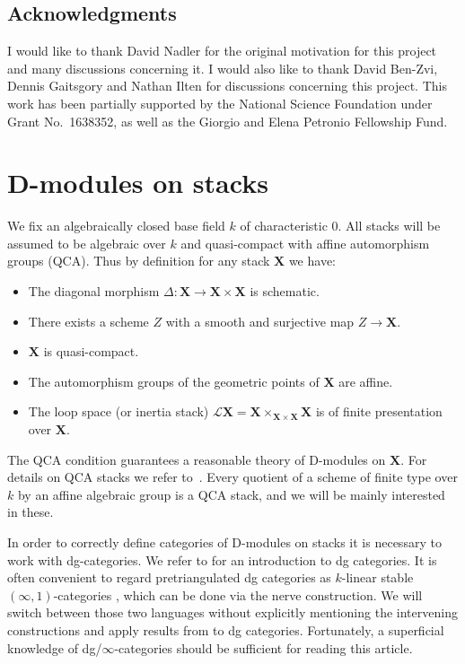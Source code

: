 \documentclass{oupau}
\theoremstyle{remark}
\let\stack\mathbf                           %
\newcommand\ls[1]{\mathcal{L} #1}
\begin{document}
\subsection*{Acknowledgments}
I would like to thank David Nadler for the original motivation for this project and many discussions concerning it.
I would also like to thank David Ben-Zvi, Dennis Gaitsgory and Nathan Ilten for discussions concerning this project.
This work has been partially supported by the National Science Foundation under Grant No.~1638352, as well as the Giorgio and Elena Petronio Fellowship Fund.

\section{D-modules on stacks}\label{sec:d-mods}

We fix an algebraically closed base field $k$ of characteristic $0$.
All stacks will be assumed to be algebraic over $k$ and quasi-compact with affine automorphism groups (QCA).
Thus by definition for any stack $\stack X$ we have:
\begin{itemize}
    \item The diagonal morphism $Δ\colon \stack X → \stack X × \stack X$ is schematic.
    \item There exists a scheme $Z$ with a smooth and surjective map $Z → \stack X$.
    \item $\stack X$ is quasi-compact.
    \item The automorphism groups of the geometric points of $\stack X$ are affine.
    \item The loop space (or inertia stack) $\ls \stack X = \stack X ×_{\stack X × \stack X} \stack X$ is of finite presentation over $\stack X$.
\end{itemize}
The QCA condition guarantees a reasonable theory of D-modules on $\stack X$.
For details on QCA stacks we refer to~\cite{DrinfeldGaitsgory:2013:FinitenessQuestions}.
Every quotient of a scheme of finite type over $k$ by an affine algebraic group is a QCA stack, and we will be mainly interested in these.

In order to correctly define categories of D-modules on stacks it is necessary to work with dg-categories.
We refer to \cite{Keller:2006:OnDGCategories} for an introduction to dg categories.
It is often convenient to regard pretriangulated dg categories as $k$-linear stable $(∞,1)$-categories \cite{Lurie:2009:HigherToposTheory,Lurie:2017-draft:HigherAlgebra}, which can be done via the nerve construction. %
We will switch between those two languages without explicitly mentioning the intervening constructions and apply results from \cite{Lurie:2017-draft:HigherAlgebra} to dg categories.
Fortunately, a superficial knowledge of dg/$∞$-categories should be sufficient for reading this article.
\end{document}
